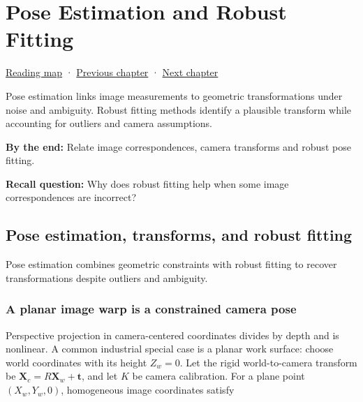 \chapter{Pose Estimation and Robust Fitting}\label{04-visual-computing-ii-ch032-pose-estimation-and-robust-fitting}\hypertarget{04-visual-computing-ii-ch032}{}\label{stagechapter:04-visual-computing-ii-ch032}

\hypertarget{04-visual-computing-ii-ch032-pose-estimation-and-robust-fitting}{}

\hyperref[volume-reading-map]{Reading map} · \hyperref[04-visual-computing-ii-ch031-learning-a-visual-classifier]{Previous chapter} · \hyperref[04-visual-computing-ii-ch034]{Next chapter}

Pose estimation links image measurements to geometric transformations under noise and ambiguity. Robust fitting methods identify a plausible transform while accounting for outliers and camera assumptions.

\textbf{By the end:} Relate image correspondences, camera transforms and robust pose fitting.

\textbf{Recall question:} Why does robust fitting help when some image correspondences are incorrect?

\section{Pose estimation, transforms, and robust fitting}\label{04-visual-computing-ii-ch032-pose-estimation-transforms-and-robust-fitting}

\hypertarget{04-visual-computing-ii-ch032-pose-estimation-transforms-and-robust-fitting}{}

Pose estimation combines geometric constraints with robust fitting to recover transformations despite outliers and ambiguity.

\subsection{A planar image warp is a constrained camera pose}\label{04-visual-computing-ii-ch032-a-planar-image-warp-is-a-constrained-camera-pose}

\hypertarget{04-visual-computing-ii-ch032-a-planar-image-warp-is-a-constrained-camera-pose}{}

Perspective projection in camera-centered coordinates divides by depth and is nonlinear. A common industrial special case is a planar work surface: choose world coordinates with its height \(Z_w=0\). Let the rigid world-to-camera transform be \(\mathbf{X}_c=R\mathbf{X}_w+\mathbf{t}\), and let \(K\) be camera calibration. For a plane point \((X_w,Y_w,0)\), homogeneous image coordinates satisfy

